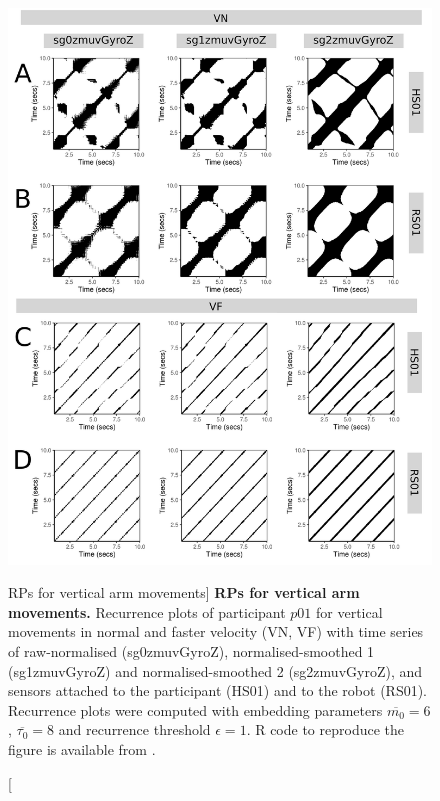 \begin{figure}
\centering
\includegraphics[height=0.80\textheight]{fig_6_07}
\caption
	[RPs for vertical arm movements]{
	{\bf RPs for vertical arm movements.}	
	Recurrence plots %
	of participant $p01$ for vertical movements in normal and faster 
	velocity (VN, VF) with time series of raw-normalised (sg0zmuvGyroZ), 
	normalised-smoothed 1 (sg1zmuvGyroZ) and 
	normalised-smoothed 2 (sg2zmuvGyroZ), and 
	sensors attached to the participant (HS01) and to the robot (RS01).
	Recurrence plots were computed with 
	embedding parameters $\overline{m_0}=6$, $\overline{\tau_0}=8$ and
	recurrence threshold $\epsilon=1$.
	R code to reproduce the figure is available from \cite{xochicale2018}.
        }
    \label{fig:rp_aV}
\end{figure}

